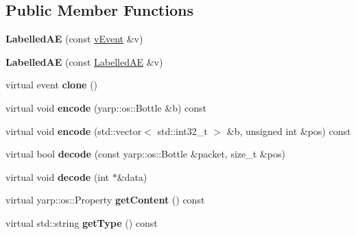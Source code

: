 \subsection*{Public Member Functions}
\begin{DoxyCompactItemize}
\item 
{\bfseries Labelled\+AE} (const \hyperlink{classev_1_1vEvent}{v\+Event} \&v)\hypertarget{classev_1_1LabelledAE_ad9d765e87dbd81bddf3b58b7ba0f1b8a}{}\label{classev_1_1LabelledAE_ad9d765e87dbd81bddf3b58b7ba0f1b8a}

\item 
{\bfseries Labelled\+AE} (const \hyperlink{classev_1_1LabelledAE}{Labelled\+AE} \&v)\hypertarget{classev_1_1LabelledAE_aeca0ead752908e7c7f22aeb69b4f7e3a}{}\label{classev_1_1LabelledAE_aeca0ead752908e7c7f22aeb69b4f7e3a}

\item 
virtual event {\bfseries clone} ()\hypertarget{classev_1_1LabelledAE_aad6de4f38547d2b586c333de1c247ccf}{}\label{classev_1_1LabelledAE_aad6de4f38547d2b586c333de1c247ccf}

\item 
virtual void {\bfseries encode} (yarp\+::os\+::\+Bottle \&b) const \hypertarget{classev_1_1LabelledAE_a8e6ad790b6c44ca7482a073f594c1bf7}{}\label{classev_1_1LabelledAE_a8e6ad790b6c44ca7482a073f594c1bf7}

\item 
virtual void {\bfseries encode} (std\+::vector$<$ std\+::int32\+\_\+t $>$ \&b, unsigned int \&pos) const \hypertarget{classev_1_1LabelledAE_a6bf1567461e6b0fc83fbbbfe42d58883}{}\label{classev_1_1LabelledAE_a6bf1567461e6b0fc83fbbbfe42d58883}

\item 
virtual bool {\bfseries decode} (const yarp\+::os\+::\+Bottle \&packet, size\+\_\+t \&pos)\hypertarget{classev_1_1LabelledAE_a6eb8dc1ac3a95d4fef78185d39f3fb94}{}\label{classev_1_1LabelledAE_a6eb8dc1ac3a95d4fef78185d39f3fb94}

\item 
virtual void {\bfseries decode} (int $\ast$\&data)\hypertarget{classev_1_1LabelledAE_acd60c91ad0bccb003642b8c403b2607e}{}\label{classev_1_1LabelledAE_acd60c91ad0bccb003642b8c403b2607e}

\item 
virtual yarp\+::os\+::\+Property {\bfseries get\+Content} () const \hypertarget{classev_1_1LabelledAE_acaf1c5db1cd5c1e639a151abd36ff57e}{}\label{classev_1_1LabelledAE_acaf1c5db1cd5c1e639a151abd36ff57e}

\item 
virtual std\+::string {\bfseries get\+Type} () const \hypertarget{classev_1_1LabelledAE_a331be65fc4ecb022ede92b02bff91ec6}{}\label{classev_1_1LabelledAE_a331be65fc4ecb022ede92b02bff91ec6}

\end{DoxyCompactItemize}
